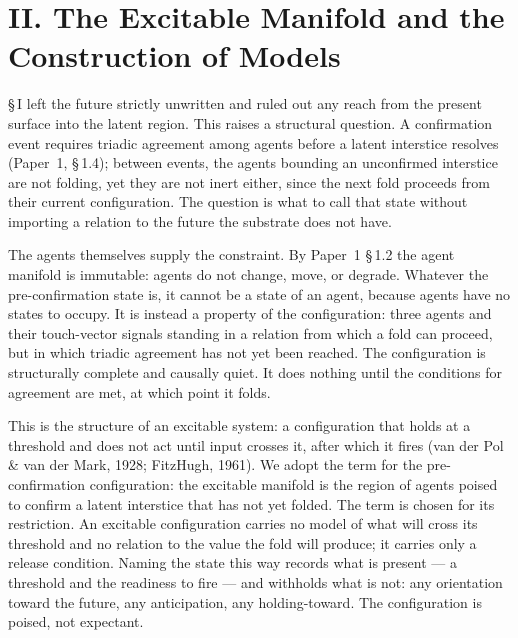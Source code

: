\documentclass[11pt,oneside]{report}
\theoremstyle{definition}
\theoremstyle{remark}
\begin{document}
\section*{II. The Excitable Manifold and the Construction of Models}

\S\,I left the future strictly unwritten and ruled out any reach from the
present surface into the latent region. This raises a structural
question. A confirmation event requires triadic agreement among agents
before a latent interstice resolves (Paper~1, \S\,1.4); between events, the
agents bounding an unconfirmed interstice are not folding, yet they are
not inert either, since the next fold proceeds from their current
configuration. The question is what to call that state without importing
a relation to the future the substrate does not have.

The agents themselves supply the constraint. By Paper~1 \S\,1.2 the agent
manifold is immutable: agents do not change, move, or degrade. Whatever
the pre-confirmation state is, it cannot be a state of an agent, because
agents have no states to occupy. It is instead a property of the
configuration: three agents and their touch-vector signals standing in a
relation from which a fold can proceed, but in which triadic agreement
has not yet been reached. The configuration is structurally complete and
causally quiet. It does nothing until the conditions for agreement are
met, at which point it folds.

This is the structure of an excitable system: a configuration that holds
at a threshold and does not act until input crosses it, after which it
fires (van der Pol \& van der Mark, 1928; FitzHugh, 1961). We adopt the
term for the pre-confirmation configuration: the excitable manifold is
the region of agents poised to confirm a latent interstice that has not
yet folded. The term is chosen for its restriction. An excitable
configuration carries no model of what will cross its threshold and no
relation to the value the fold will produce; it carries only a release
condition. Naming the state this way records what is present --- a
threshold and the readiness to fire --- and withholds what is not: any
orientation toward the future, any anticipation, any holding-toward. The
configuration is poised, not expectant.
\end{document}

